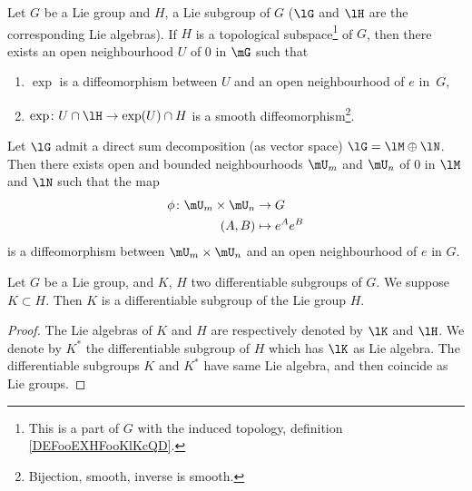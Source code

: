 \begin{lemma}       \label{LEMooOBIMooVvIDnb}
	Let $G$ be a Lie group and $H$, a Lie subgroup of $G$ ($\lG$ and $\lH$ are the corresponding Lie algebras). If $H$ is a topological subspace\footnote{This is a part of \( G\) with the induced topology, definition \ref{DEFooEXHFooKlKcQD}.} of $G$, then there exists an open neighbourhood $U$ of $0$ in $\mG$ such that
	\begin{enumerate}
		\item $\exp$ is a diffeomorphism between $U$ and an open neighbourhood of $e$ in~$G$,
		\item		\label{ITEMooVGGXooRIXOQc}
		      \( \exp\colon U\cap\lH\to \exp(U)\cap H\) is a smooth diffeomorphism\footnote{Bijection, smooth, inverse is smooth.}.
	\end{enumerate}
\end{lemma}


\begin{lemma}  \label{LEMooEBQUooKXkCda}
	Let $\lG$ admit a direct sum decomposition (as vector space) $\lG=\lM\oplus\lN$. Then there exists open and bounded neighbourhoods $\mU_m$ and $\mU_n$ of $0$ in $\lM$ and $\lN$ such that the map
	\begin{equation}
		\begin{aligned}
			\phi \colon \mU_m\times\mU_n & \to G          \\
			(A,B)                        & \mapsto e^Ae^B
		\end{aligned}
	\end{equation}
	is a diffeomorphism between $\mU_m\times\mU_n$ and an open neighbourhood of $e$ in $G$.
\end{lemma}


\begin{corollary}
	Let $G$ be a Lie group, and $K$, $H$ two differentiable subgroups of $G$. We suppose $K\subset H$. Then $K$ is a differentiable subgroup of the Lie group $H$.
\end{corollary}

\begin{proof}
	The Lie algebras of $K$ and $H$ are respectively denoted by $\lK$ and $\lH$. We denote by $K^*$ the differentiable subgroup of $H$ which has $\lK$ as Lie algebra. The differentiable subgroups $K$ and $K^*$ have same Lie algebra, and then coincide as Lie groups.
\end{proof}

